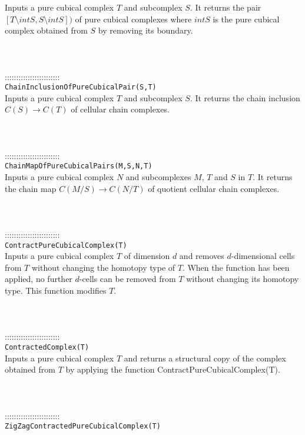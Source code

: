 \documentclass[a4paper,11pt]{report}
\begin{document}
{ Inputs a pure cubical complex $T$ and subcomplex $S$. It returns the pair $[T\setminus intS, S\setminus intS])$ of pure cubical complexes where $intS$ is the pure cubical complex obtained from $S$ by removing its boundary. \\
 \\
 \\
 \\
 ::::::::::::::::::::::::\\
 \texttt{ChainInclusionOfPureCubicalPair(S,T)}\\
 

 Inputs a pure cubical complex $T$ and subcomplex $S$. It returns the chain inclusion $C(S) \rightarrow C(T)$ of cellular chain complexes. \\
 \\
 \\
 \\
 ::::::::::::::::::::::::\\
 \texttt{ChainMapOfPureCubicalPairs(M,S,N,T)}\\
 

 Inputs a pure cubical complex $N$ and subcomplexes $M$, $T$ and $S$ in $T$. It returns the chain map $C(M/S) \rightarrow C(N/T)$ of quotient cellular chain complexes. \\
 \\
 \\
 \\
 ::::::::::::::::::::::::\\
 \texttt{ContractPureCubicalComplex(T)}\\
 

 Inputs a pure cubical complex $T$ of dimension $d$ and removes $d$-dimensional cells from $T$ without changing the homotopy type of $T$. When the function has been applied, no further $d$-cells can be removed from $T$ without changing its homotopy type. This function modifies $T$. \\
 \\
 \\
 \\
 ::::::::::::::::::::::::\\
 \texttt{ContractedComplex(T)}\\
 

 Inputs a pure cubical complex $T$ and returns a structural copy of the complex obtained from $T$ by applying the function ContractPureCubicalComplex(T). \\
 \\
 \\
 \\
 ::::::::::::::::::::::::\\
 \texttt{ZigZagContractedPureCubicalComplex(T)}\\
 

}
\end{document}
